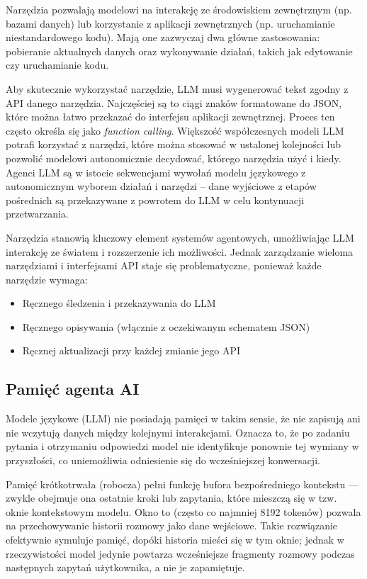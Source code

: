 Narzędzia pozwalają modelowi na interakcję ze środowiskiem zewnętrznym (np. bazami danych) lub korzystanie z aplikacji zewnętrznych (np. uruchamianie niestandardowego kodu). Mają one zazwyczaj dwa główne zastosowania: pobieranie aktualnych danych oraz wykonywanie działań, takich jak edytowanie czy uruchamianie kodu.

Aby skutecznie wykorzystać narzędzie, LLM musi wygenerować tekst zgodny z API danego narzędzia. Najczęściej są to ciągi znaków formatowane do JSON, które można łatwo przekazać do interfejsu aplikacji zewnętrznej. Proces ten często określa się jako \textit{function calling}. Większość współczesnych modeli LLM potrafi korzystać z narzędzi, które można stosować w ustalonej kolejności lub pozwolić modelowi autonomicznie decydować, którego narzędzia użyć i kiedy. Agenci LLM są w istocie sekwencjami wywołań modelu językowego z autonomicznym wyborem działań i narzędzi – dane wyjściowe z etapów pośrednich są przekazywane z powrotem do LLM w celu kontynuacji przetwarzania.

Narzędzia stanowią kluczowy element systemów agentowych, umożliwiając LLM interakcję ze światem i rozszerzenie ich możliwości. Jednak zarządzanie wieloma narzędziami i interfejsami API staje się problematyczne, ponieważ każde narzędzie wymaga:
\begin{itemize}
\item Ręcznego śledzenia i przekazywania do LLM
\item Ręcznego opisywania (włącznie z oczekiwanym schematem JSON)
\item Ręcznej aktualizacji przy każdej zmianie jego API
\end{itemize}

\subsection{Pamięć agenta AI}
Modele językowe (LLM) nie posiadają pamięci w takim sensie, że nie zapisują ani nie wczytują danych między kolejnymi interakcjami. Oznacza to, że po zadaniu pytania i otrzymaniu odpowiedzi model nie identyfikuje ponownie tej wymiany w przyszłości, co uniemożliwia odniesienie się do wcześniejszej konwersacji.

Pamięć krótkotrwała (robocza) pełni funkcję bufora bezpośredniego kontekstu — zwykle obejmuje ona ostatnie kroki lub zapytania, które mieszczą się w tzw. oknie kontekstowym modelu. Okno to (często co najmniej 8192 tokenów) pozwala na przechowywanie historii rozmowy jako dane wejściowe. Takie rozwiązanie efektywnie symuluje pamięć, dopóki historia mieści się w tym oknie; jednak w rzeczywistości model jedynie powtarza wcześniejsze fragmenty rozmowy podczas następnych zapytań użytkownika, a nie je zapamiętuje.

